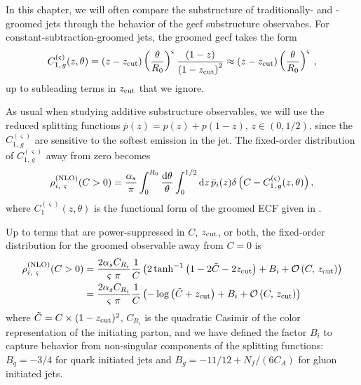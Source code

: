 \begin{example}
    In this chapter, we will often compare the substructure of traditionally- and \PIRANHA{}-groomed jets through the behavior of the \gls{gecf} substructure observabes.
    For constant-subtraction-groomed jets, the groomed \gls{gecf} takes the form
\begin{equation}
    \label{eq:subtracted-ecf-defn}
    C_{1,\,g}^{(\varsigma)}(z,\theta)
    =
    \left(z - \zcut\right) \left(\frac{\theta}{R_0}\right)^\varsigma \frac{\left(1 - z\right)}{\left(1 - \zcut\right)^2}
    \approx
    \left(z - \zcut\right)\left(\frac{\theta}{R_0}\right)^\varsigma
    \,,
\end{equation}
up to subleading terms in \(z_{\rm cut}\) that we ignore.
\end{example}


\begin{example}
    \label{ex:constant-subtraction-gecf}
    As usual when studying additive substructure observables, we will use the reduced splitting functions \(\bar{p}(z) = p(z) + p(1-z)\), \(z \in (0,1/2)\), since the \(C_{1,\,g}^{(\varsigma)}\) are sensitive to the softest emission in the jet.
   The fixed-order distribution of \(C_{1,\,g}^{(\varsigma)}\) away from zero becomes
%
\begin{align}
    \rho^{\rm(NLO)}_{i,~\varsigma}(C>0)
    =
    \frac{\alpha_s}{\pi}\int_0^{R_0}\frac{\dd\theta}{\theta}
    \int_0^{1/2} \dd z\, \Bar{p}_i(z)
    \delta\left(C - C_{1,\,g}^{(\varsigma)}(z,\theta)\right),
    \label{eq:NLO_dist_setup}
\end{align}
%
where  \(C_1^{(\varsigma)}(z,\theta)\) is the functional form of the groomed ECF given in .

Up to terms that are power-suppressed in \(C\), \(z_{\rm cut}\), or both, the fixed-order distribution for the groomed observable away from \(C = 0\) is
%
\begin{subequations}
\label{eq:piranha_nlo}
\begin{align}
    \rho^{\rm(NLO)}_{i,~\varsigma}(C>0)
    &=
    \frac{2\alpha_s C_{R_i}}{\varsigma~\pi}
    \frac{1}{C}
    \left(
        2\tanh^{-1}\left(1  -2 \tilde C - 2z_{\rm cut}\right)
        + B_i
        +
        \mathcal{O}\left(C,\,z_{\rm cut}\right)
    \right)
    \\
    &=
    \frac{2\alpha_s C_{R_i}}{\varsigma~\pi}
    \frac{1}{C}
    \left(
        -\log\left(\tilde C + z_{\rm cut}\right)
        + B_i
        +
        \mathcal{O}\left(C,\,z_{\rm cut}\right)
    \right)
\end{align}
\end{subequations}
%
where \(\tilde C = C \times (1-z_{\rm cut})^2\), \(C_{R_i}\) is the quadratic Casimir of the color representation of the initiating parton, and we have defined the factor \(B_i\) to capture behavior from non-singular components of the splitting functions:
%
\(B_q = -3/4\) for quark initiated jets and \(B_g = -11/12 + N_f/(6 C_A)\) for gluon initiated jets.
\end{example}

